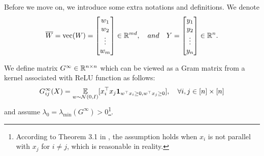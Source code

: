 Before we move on, we introduce some extra notations and definitions. We denote%
\begin{align*}
    \overline{W} = \mathrm{vec}(W) = \left[\begin{matrix}
    w_1\\
    w_2\\
    \vdots\\
    w_m
    \end{matrix}
    \right] \in \mathbb{R}^{md}, ~~~and~~~
    Y = \left[\begin{matrix}
    y_1\\
    y_2\\
    \vdots\\
    y_n
    \end{matrix}
    \right] \in \mathbb{R}^{n}.
\end{align*}

\begin{definition}
We define matrix $G^{\infty}\in\mathbb{R}^{n\times n}$ which can be viewed as a Gram matrix from a kernel associated with ReLU function as follows:
\begin{align*}
    G^{\infty}_{ij}(X) = \operatorname*{{\mathbb{E}}}_{w\sim\mathcal{N}(0,I)}[x_i^\top x_j \mathbf{1}_{w^\top x_i \geq 0, w^\top x_j\geq 0}],~~~ \forall i, j\in [n]\times [n]
\end{align*}
and assume $\lambda_0 = \lambda_{\min}(G^{\infty}) > 0$\footnote{According to Theorem 3.1 in \cite{dzps19}, the assumption holds when $x_i$ is not parallel with $x_j$ for $i\neq j$, which is reasonable in reality.}.
\end{definition}


